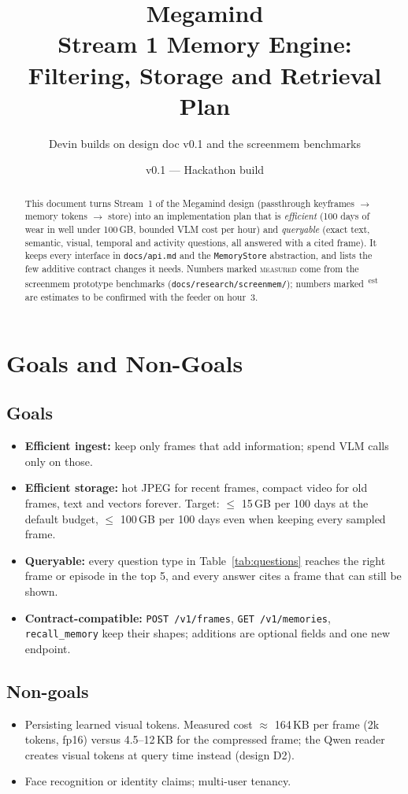 \documentclass[11pt,a4paper]{article}
\title{\textbf{\color{mmblue}Megamind}\\[4pt]\large Stream 1 Memory Engine: Filtering, Storage and Retrieval Plan}
\author{Devin \quad\textperiodcentered\quad builds on design doc v0.1 and the screenmem benchmarks}
\date{v0.1 --- Hackathon build}
\newcommand{\est}{\textsuperscript{\color{mmorange}\,est}}
\begin{document}
\maketitle
\thispagestyle{empty}

\begin{abstract}
\noindent This document turns Stream~1 of the Megamind design (passthrough keyframes $\rightarrow$ memory tokens $\rightarrow$ store) into an implementation plan that is \emph{efficient} (100 days of wear in well under 100\,GB, bounded VLM cost per hour) and \emph{queryable} (exact text, semantic, visual, temporal and activity questions, all answered with a cited frame). It keeps every interface in \texttt{docs/api.md} and the \texttt{MemoryStore} abstraction, and lists the few additive contract changes it needs. Numbers marked \textsc{measured} come from the screenmem prototype benchmarks (\texttt{docs/research/screenmem/}); numbers marked \est{} are estimates to be confirmed with the feeder on hour~3.
\end{abstract}

\tableofcontents
\newpage

\section{Goals and Non-Goals}
\subsection{Goals}
\begin{itemize}
  \item \textbf{Efficient ingest:} keep only frames that add information; spend VLM calls only on those.
  \item \textbf{Efficient storage:} hot JPEG for recent frames, compact video for old frames, text and vectors forever. Target: $\le$ 15\,GB per 100 days at the default budget, $\le$ 100\,GB per 100 days even when keeping every sampled frame.
  \item \textbf{Queryable:} every question type in Table~\ref{tab:questions} reaches the right frame or episode in the top 5, and every answer cites a frame that can still be shown.
  \item \textbf{Contract-compatible:} \texttt{POST /v1/frames}, \texttt{GET /v1/memories}, \texttt{recall\_memory} keep their shapes; additions are optional fields and one new endpoint.
\end{itemize}
\subsection{Non-goals}
\begin{itemize}
  \item Persisting learned visual tokens. Measured cost $\approx$ 164\,KB per frame (2k tokens, fp16) versus 4.5--12\,KB for the compressed frame; the Qwen reader creates visual tokens at query time instead (design D2).
  \item Face recognition or identity claims; multi-user tenancy.
\end{itemize}
\end{document}
